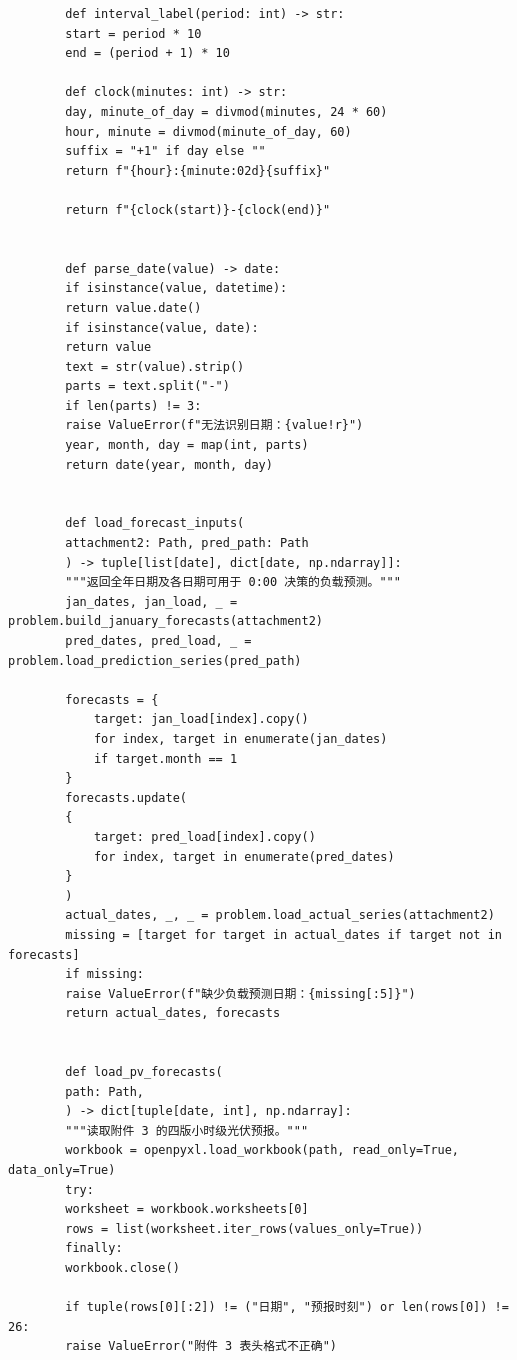 \documentclass[UTF8]{ctexart}
\begin{document}
\begin{verbatim}
        def interval_label(period: int) -> str:
        start = period * 10
        end = (period + 1) * 10
        
        def clock(minutes: int) -> str:
        day, minute_of_day = divmod(minutes, 24 * 60)
        hour, minute = divmod(minute_of_day, 60)
        suffix = "+1" if day else ""
        return f"{hour}:{minute:02d}{suffix}"
        
        return f"{clock(start)}-{clock(end)}"
        
        
        def parse_date(value) -> date:
        if isinstance(value, datetime):
        return value.date()
        if isinstance(value, date):
        return value
        text = str(value).strip()
        parts = text.split("-")
        if len(parts) != 3:
        raise ValueError(f"无法识别日期：{value!r}")
        year, month, day = map(int, parts)
        return date(year, month, day)
        
        
        def load_forecast_inputs(
        attachment2: Path, pred_path: Path
        ) -> tuple[list[date], dict[date, np.ndarray]]:
        """返回全年日期及各日期可用于 0:00 决策的负载预测。"""
        jan_dates, jan_load, _ = problem.build_january_forecasts(attachment2)
        pred_dates, pred_load, _ = problem.load_prediction_series(pred_path)
        
        forecasts = {
            target: jan_load[index].copy()
            for index, target in enumerate(jan_dates)
            if target.month == 1
        }
        forecasts.update(
        {
            target: pred_load[index].copy()
            for index, target in enumerate(pred_dates)
        }
        )
        actual_dates, _, _ = problem.load_actual_series(attachment2)
        missing = [target for target in actual_dates if target not in forecasts]
        if missing:
        raise ValueError(f"缺少负载预测日期：{missing[:5]}")
        return actual_dates, forecasts
        
        
        def load_pv_forecasts(
        path: Path,
        ) -> dict[tuple[date, int], np.ndarray]:
        """读取附件 3 的四版小时级光伏预报。"""
        workbook = openpyxl.load_workbook(path, read_only=True, data_only=True)
        try:
        worksheet = workbook.worksheets[0]
        rows = list(worksheet.iter_rows(values_only=True))
        finally:
        workbook.close()
        
        if tuple(rows[0][:2]) != ("日期", "预报时刻") or len(rows[0]) != 26:
        raise ValueError("附件 3 表头格式不正确")
        

\end{verbatim}
\end{document}
